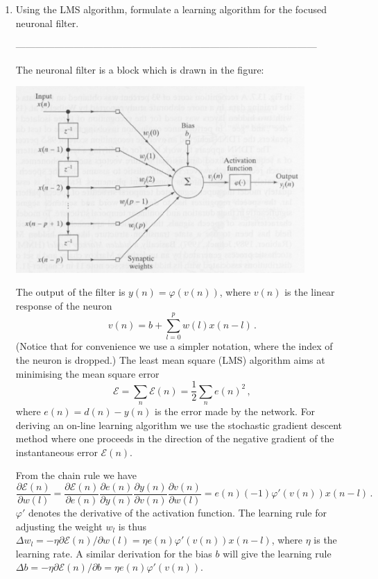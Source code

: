 \documentclass[10pt]{article}
\begin{document}
\begin{enumerate}
\vspace{2cm}
\item Using the LMS algorithm, formulate a learning algorithm for the
  focused neuronal filter.


---------------------------------------------------------------------------------------------

The neuronal filter is a block which is drawn in the figure:
%  
%

\begin{center}
\includegraphics[width=11cm]{l12k3a.eps}
\end{center}

%
The output of the filter is $y(n) =
  \varphi(v(n))$, where $v(n)$ is the linear response of the neuron $$v(n) = b +
  \sum_{l=0}^p w(l) x(n-l) \, .$$ (Notice that for convenience we use
  a simpler notation, where the index of the neuron is dropped.)
  The least mean square (LMS) algorithm aims at minimising the mean
  square error $$\mathcal{E} = \sum_n \mathcal{E}(n) = \frac{1}{2} \sum_n e(n)^2 \, ,$$
  where $e(n) = d(n) - y(n)$ is the error made by the network.  For deriving an
  on-line learning algorithm we  use the stochastic
  gradient descent method where one proceeds in the direction of the negative
  gradient of the instantaneous
  error $\mathcal{E}(n)$.

  From the chain rule we have $$\frac{\partial \mathcal{E}(n)}{\partial w(l)} =
  \frac{\partial \mathcal{E}(n)}{\partial e(n)} \frac{\partial e(n)}{\partial
    y(n)} \frac{\partial y(n)}{\partial v(n)} \frac{\partial
    v(n)}{\partial w(l)} = e(n) (-1) \varphi'(v(n)) x(n-l) \, .$$ 
$\varphi'$ denotes the derivative of the activation function.
The
  learning rule for adjusting the weight $w_l$ is thus $\Delta w_l = -\eta \partial \mathcal{E}(n) / \partial
  w(l) = \eta e(n) \varphi'(v(n)) x(n-l)$, where $\eta$ is the learning
  rate.  A similar derivation for the bias $b$ will give the learning
  rule $\Delta b = - \eta \partial \mathcal{E}(n) / \partial b = \eta e(n)
  \varphi'(v(n))$.



\end{enumerate}
\end{document}

